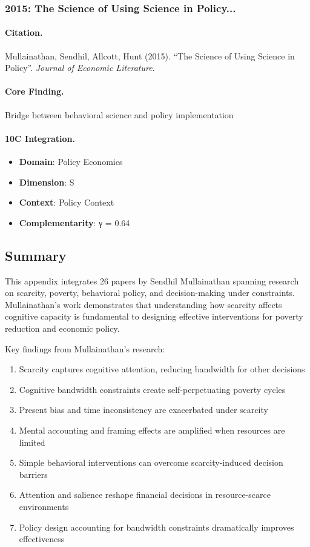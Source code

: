 \subsubsection{2015: The Science of Using Science in Policy...}

\paragraph{Citation.}
Mullainathan, Sendhil, Allcott, Hunt (2015). ``The Science of Using Science in Policy''. \textit{Journal of Economic Literature}.

\paragraph{Core Finding.}
Bridge between behavioral science and policy implementation

\paragraph{10C Integration.}
\begin{itemize}[nosep]
  \item \textbf{Domain}: Policy Economics
  \item \textbf{Dimension}: S
  \item \textbf{Context}: Policy Context
  \item \textbf{Complementarity}: γ = 0.64
\end{itemize}


\subsection{Summary}

This appendix integrates 26 papers by Sendhil Mullainathan spanning research on scarcity, poverty, behavioral policy, and decision-making under constraints. Mullainathan's work demonstrates that understanding how scarcity affects cognitive capacity is fundamental to designing effective interventions for poverty reduction and economic policy.

Key findings from Mullainathan's research:

\begin{enumerate}
  \item Scarcity captures cognitive attention, reducing bandwidth for other decisions
  \item Cognitive bandwidth constraints create self-perpetuating poverty cycles
  \item Present bias and time inconsistency are exacerbated under scarcity
  \item Mental accounting and framing effects are amplified when resources are limited
  \item Simple behavioral interventions can overcome scarcity-induced decision barriers
  \item Attention and salience reshape financial decisions in resource-scarce environments
  \item Policy design accounting for bandwidth constraints dramatically improves effectiveness
\end{enumerate}

